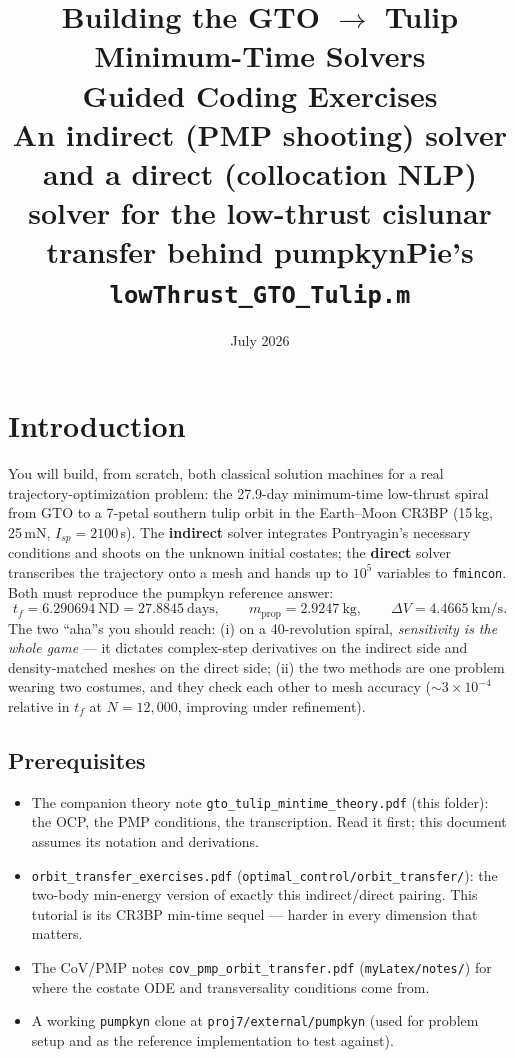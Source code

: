 \documentclass[11pt,letterpaper]{article}
\title{\textbf{Building the GTO $\to$ Tulip Minimum-Time Solvers}\\[8pt]
\large Guided Coding Exercises\\[4pt]
\normalsize An indirect (PMP shooting) solver and a direct (collocation NLP)
solver for the low-thrust cislunar transfer behind pumpkynPie's
\texttt{lowThrust\_GTO\_Tulip.m}}
\author{}
\date{July 2026}
\begin{document}
\maketitle
\thispagestyle{fancy}

\tableofcontents
\newpage

\section{Introduction}

You will build, from scratch, both classical solution machines for a real
trajectory-optimization problem: the 27.9-day minimum-time low-thrust spiral
from GTO to a 7-petal southern tulip orbit in the Earth--Moon CR3BP (15\,kg,
25\,mN, $I_{sp}=2100$\,s). The \textbf{indirect} solver integrates
Pontryagin's necessary conditions and shoots on the unknown initial
costates; the \textbf{direct} solver transcribes the trajectory onto a mesh
and hands up to $10^5$ variables to \texttt{fmincon}. Both must reproduce
the pumpkyn reference answer:
\[
  t_f = 6.290694\ \text{ND} = 27.8845\ \text{days},\qquad
  m_{\text{prop}} = 2.9247\ \text{kg},\qquad
  \Delta V = 4.4665\ \text{km/s}.
\]
The two ``aha''s you should reach: (i) on a 40-revolution spiral,
\emph{sensitivity is the whole game} --- it dictates complex-step
derivatives on the indirect side and density-matched meshes on the direct
side; (ii) the two methods are one problem wearing two costumes, and they check
each other to mesh accuracy ($\sim 3\times 10^{-4}$ relative in $t_f$ at
$N = 12{,}000$, improving under refinement).

\subsection{Prerequisites}

\begin{itemize}[leftmargin=1.6em,nosep]
  \item The companion theory note \texttt{gto\_tulip\_mintime\_theory.pdf}
  (this folder): the OCP, the PMP conditions, the transcription. Read it
  first; this document assumes its notation and derivations.
  \item \texttt{orbit\_transfer\_exercises.pdf}
  (\texttt{optimal\_control/orbit\_transfer/}): the two-body min-energy
  version of exactly this indirect/direct pairing. This tutorial is its
  CR3BP min-time sequel --- harder in every dimension that matters.
  \item The CoV/PMP notes \texttt{cov\_pmp\_orbit\_transfer.pdf}
  (\texttt{myLatex/notes/}) for where the costate ODE and transversality
  conditions come from.
  \item A working \texttt{pumpkyn} clone at
  \texttt{proj7/external/pumpkyn} (used for problem setup and as the
  reference implementation to test against).
\end{itemize}
\end{document}
